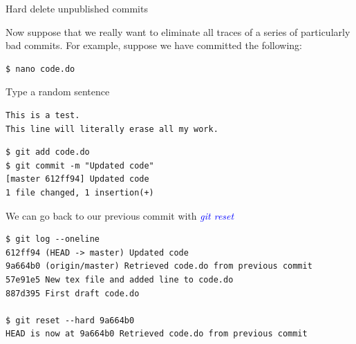 \documentclass[11pt]{beamer}
\begin{document}
\begin{frame}[fragile]{Hard delete unpublished commits}

Now suppose that we really want to eliminate all traces of a series of particularly bad commits. For example, suppose we have committed the following:
\begin{lstlisting}
$ nano code.do
\end{lstlisting}
Type a random sentence
\begin{lstlisting}
This is a test.
This line will literally erase all my work.
\end{lstlisting}
\begin{lstlisting}
$ git add code.do
$ git commit -m "Updated code"
[master 612ff94] Updated code
1 file changed, 1 insertion(+)
\end{lstlisting}

We can go back to our previous commit with \textcolor{blue}{\emph{git reset}}

\begin{lstlisting}
$ git log --oneline
612ff94 (HEAD -> master) Updated code
9a664b0 (origin/master) Retrieved code.do from previous commit
57e91e5 New tex file and added line to code.do
887d395 First draft code.do

$ git reset --hard 9a664b0
HEAD is now at 9a664b0 Retrieved code.do from previous commit
\end{lstlisting}
\end{frame}
\end{document}

